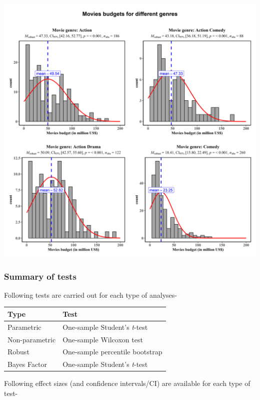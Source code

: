 \documentclass[]{article}
\begin{document}
\includegraphics[width=1\linewidth]{./figures/paper-gghistostats4-1}

\hypertarget{summary-of-tests-5}{%
\subsubsection{Summary of tests}\label{summary-of-tests-5}}

Following tests are carried out for each type of analyses-

\begin{longtable}[]{@{}ll@{}}
\toprule
Type & Test\tabularnewline
\midrule
\endhead
Parametric & One-sample Student's \emph{t}-test\tabularnewline
Non-parametric & One-sample Wilcoxon test\tabularnewline
Robust & One-sample percentile bootstrap\tabularnewline
Bayes Factor & One-sample Student's \emph{t}-test\tabularnewline
\bottomrule
\end{longtable}

Following effect sizes (and confidence intervals/CI) are available for each type
of test-
\end{document}
